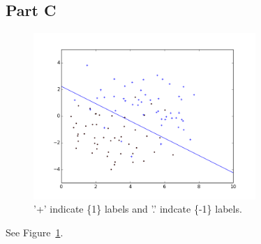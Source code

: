 \documentclass[11pt]{article}
\begin{document}
\subsection*{Part C}
\begin{figure}
	\centering
\includegraphics[width=0.75\textwidth]{../p1.png}
	\caption{ '+' indicate \{1\} labels and '.' indcate \{-1\} labels.}
	\label{fig:1c}
\end{figure}

See Figure~\ref{fig:1c}.





\end{document}
